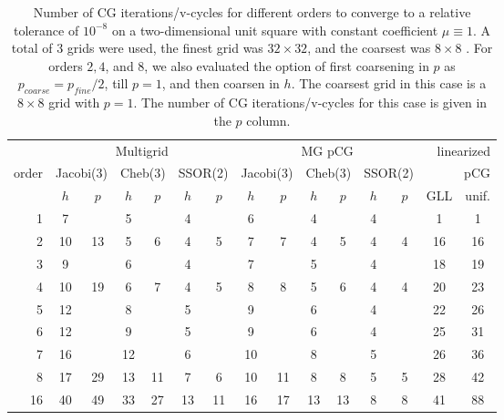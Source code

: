\begin{table}
  \caption{\label{tab:box} Number of CG iterations/v-cycles for
    different orders to converge to a relative tolerance of $10^{-8}$
    on a two-dimensional unit square with constant coefficient
    $\mu\equiv 1$. A total of 3 grids were used, the finest grid was
    $32\times 32$, and the coarsest was $8\times 8$ . For orders $2,4$, and $8$, we also evaluated the option
    of first coarsening in $p$ as $p_{coarse} = p_{fine}/2$, till
    $p=1$, and then coarsen in $h$. The coarsest grid in this case is
    a $8\times 8$ grid with $p=1$. The number of CG
    iterations/v-cycles for this case is given in the $p$ column.}
  \centering
  \begin{tabular}{|r|c|c|c|c|c|c|c|c|c|c|c|c|c|c|} 
    \hline
    & \multicolumn{6}{c|}{Multigrid} & \multicolumn{6}{c|}{MG pCG} & \multicolumn{2}{r|}{linearized} \\
    \cline{2-13}
    \!\!\! order \!\!\!\! &  \multicolumn{2}{c|}{\!\scriptsize  Jacobi(3)\!} &  \multicolumn{2}{c|}{\!\scriptsize Cheb(3)\!} & \multicolumn{2}{c|}{\!\scriptsize  SSOR(2)\!} & \multicolumn{2}{c|}{\!\scriptsize Jacobi(3)\!} &  \multicolumn{2}{c|}{\!\scriptsize Cheb(3)\!} & \multicolumn{2}{c|}{\!\scriptsize SSOR(2)\!} & \multicolumn{2}{r|}{pCG}\\
\hline
 & $h$ & $p$ & $h$ & $p$& $h$ & $p$& $h$ & $p$& $h$ & $p$& $h$ & $p$& GLL & unif.\\
 \cline{2-15}
1 & 7 & & 5 & & 4 & & 6 & & 4 & & 4 & & 1 & 1  \\
2 & 10 & 13 & 5 & 6 & 4 & 5 & 7 & 7 & 4 & 5 & 4 & 4 & 16 & 16 \\
3 & 9 & & 6 & & 4 & & 7 & & 5 & & 4 & & 18 & 19  \\
4 & 10 & 19 & 6 & 7 & 4 & 5 & 8 & 8 & 5 & 6 & 4 & 4 & 20 & 23 \\
5 & 12 & & 8 & & 5 & & 9 & & 6 & & 4 & & 22 & 26  \\
6 & 12 & & 9 & & 5 & & 9 & & 6 & & 4 & & 25 & 31  \\
7 & 16 & & 12 & & 6 & & 10 & & 8 & & 5 & & 26 & 36  \\
8 & 17 & 29 & 13 & 11 & 7 & 6 & 10 & 11 & 8 & 8 & 5 & 5 & 28 & 42 \\
16 & 40 & 49 & 33 & 27 & 13 & 11 & 16 & 17 & 13 & 13 & 8 & 8 & 41 & 88\\
\hline
  \end{tabular}
\end{table}

